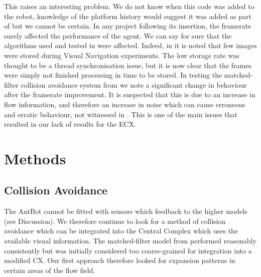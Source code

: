 \documentclass[a4paper,11pt,twoside,openright]{article}
\let\oldsection\section
\def\section{\cleardoublepage\oldsection}
\begin{document}
This raises an interesting problem. We do not know when this code was
added to the robot, knowledge of the platform history would suggest it
was added as part of \cite{Scimeca2017} but we cannot be certain.  In
any project following its insertion, the framerate surely affected the
performance of the agent. We can say for sure that the algorithms used
and tested in \cite{Mitchell2018} were affected. Indeed, in
\cite{Mitchell2018} it is noted that few images were stored during
Visual Navigation experiments. The low storage rate was thought to be
a thread synchronisation issue, but it is now clear that the frames
were simply not finished processing in time to be stored.  In testing
the matched-filter collision avoidance system from \cite{Mitchell2018}
we note a significant change in behaviour after the framerate
improvement. It is suspected that this is due to an increase in flow
information, and therefore an increase in noise which can cause
erroneous and erratic behaviour, not witnessed in \cite{Mitchell2018}.
This is one of the main issues that resulted in our lack of results
for the ECX.
\newpage

\section{ Methods } \label{sec:methods}
\subsection{ Collision Avoidance }
The AntBot cannot be fitted with sensors which feedback to the higher models
(see Discussion). We therefore continue to look for a method of collision
avoidance which can be integrated into the Central Complex which uses the
available visual information. The matched-filter model from \cite{Mitchell2018}
performed reasonably consistently but was initially considered too coarse-grained
for integration into a modified CX. Our first approach therefore looked for
expansion patterns in certain areas of the flow field.
\end{document}
